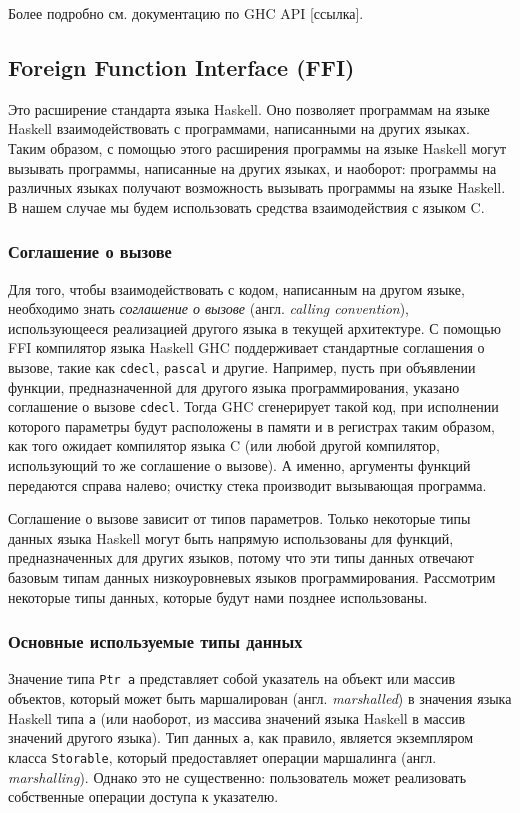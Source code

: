 	Более подробно см. документацию по GHC API [ссылка]. %
	\subsection{Foreign Function Interface (FFI)} Это расширение стандарта языка Haskell. Оно позволяет программам на языке Haskell взаимодействовать с программами, написанными на других языках. Таким образом, с помощью этого расширения программы на языке Haskell могут вызывать программы, написанные на других языках, и наоборот: программы на различных языках получают возможность вызывать программы на языке Haskell. В нашем случае мы будем использовать средства взаимодействия с языком C. 
	
	\subsubsection{Соглашение о вызове} Для того, чтобы взаимодействовать с кодом, написанным на другом языке, необходимо знать \textit{соглашение о вызове} (англ. \textit{calling convention}), использующееся реализацией другого языка в текущей архитектуре. С помощью FFI компилятор языка Haskell GHC поддерживает стандартные соглашения о вызове, такие как \lstinline{cdecl}, \lstinline{pascal} и другие. Например, пусть при объявлении функции, предназначенной для другого языка программирования, указано соглашение о вызове \lstinline{cdecl}. Тогда GHC сгенерирует такой код, при исполнении которого параметры будут расположены в памяти и в регистрах таким образом, как того ожидает компилятор языка C (или любой другой компилятор, использующий то же соглашение о вызове). А именно, аргументы функций передаются справа налево; очистку стека производит вызывающая программа.
	
	Соглашение о вызове зависит от типов параметров. Только некоторые типы данных языка Haskell могут быть напрямую использованы для функций, предназначенных для других языков, потому что эти типы данных отвечают базовым типам данных низкоуровневых языков программирования. Рассмотрим некоторые типы данных, которые будут нами позднее использованы.
	
	\subsubsection{Основные используемые типы данных} Значение типа \lstinline{Ptr a} представляет собой указатель на объект или массив объектов, который может быть маршалирован (англ. \textit{marshalled}) в значения языка Haskell типа \lstinline{a} (или наоборот, из массива значений языка Haskell в массив значений другого языка). Тип данных \lstinline{a}, как правило, является экземпляром класса \lstinline{Storable}, который предоставляет операции маршалинга (англ. \textit{marshalling}). Однако это не существенно: пользователь может реализовать собственные операции доступа к указателю.
	

